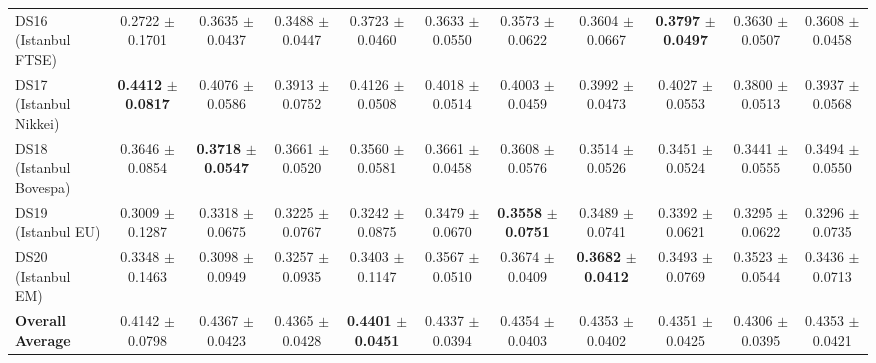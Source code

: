 \begin{table}[t]
{{\begin{tabular}{lcccccccccc}
DS16 (Istanbul FTSE) & 0.2722 $\pm$ 0.1701 & 0.3635 $\pm$ 0.0437 & 0.3488 $\pm$ 0.0447 & 0.3723 $\pm$ 0.0460 & 0.3633 $\pm$ 0.0550 & 0.3573 $\pm$ 0.0622 & 0.3604 $\pm$ 0.0667 & \textbf{0.3797} $\pm$ \textbf{0.0497} & 0.3630 $\pm$ 0.0507 & 0.3608 $\pm$ 0.0458 \\
DS17 (Istanbul Nikkei) & \textbf{0.4412} $\pm$ \textbf{0.0817} & 0.4076 $\pm$ 0.0586 & 0.3913 $\pm$ 0.0752 & 0.4126 $\pm$ 0.0508 & 0.4018 $\pm$ 0.0514 & 0.4003 $\pm$ 0.0459 & 0.3992 $\pm$ 0.0473 & 0.4027 $\pm$ 0.0553 & 0.3800 $\pm$ 0.0513 & 0.3937 $\pm$ 0.0568 \\
DS18 (Istanbul Bovespa) & 0.3646 $\pm$ 0.0854 & \textbf{0.3718} $\pm$ \textbf{0.0547} & 0.3661 $\pm$ 0.0520 & 0.3560 $\pm$ 0.0581 & 0.3661 $\pm$ 0.0458 & 0.3608 $\pm$ 0.0576 & 0.3514 $\pm$ 0.0526 & 0.3451 $\pm$ 0.0524 & 0.3441 $\pm$ 0.0555 & 0.3494 $\pm$ 0.0550 \\
DS19 (Istanbul EU) & 0.3009 $\pm$ 0.1287 & 0.3318 $\pm$ 0.0675 & 0.3225 $\pm$ 0.0767 & 0.3242 $\pm$ 0.0875 & 0.3479 $\pm$ 0.0670 & \textbf{0.3558} $\pm$ \textbf{0.0751} & 0.3489 $\pm$ 0.0741 & 0.3392 $\pm$ 0.0621 & 0.3295 $\pm$ 0.0622 & 0.3296 $\pm$ 0.0735 \\
DS20 (Istanbul EM) & 0.3348 $\pm$ 0.1463 & 0.3098 $\pm$ 0.0949 & 0.3257 $\pm$ 0.0935 & 0.3403 $\pm$ 0.1147 & 0.3567 $\pm$ 0.0510 & 0.3674 $\pm$ 0.0409 & \textbf{0.3682} $\pm$ \textbf{0.0412} & 0.3493 $\pm$ 0.0769 & 0.3523 $\pm$ 0.0544 & 0.3436 $\pm$ 0.0713 \\
\midrule
\textbf{Overall Average} & 0.4142 $\pm$ 0.0798 & 0.4367 $\pm$ 0.0423 & 0.4365 $\pm$ 0.0428 & \textbf{0.4401} $\pm$ \textbf{0.0451} & 0.4337 $\pm$ 0.0394 & 0.4354 $\pm$ 0.0403 & 0.4353 $\pm$ 0.0402 & 0.4351 $\pm$ 0.0425 & 0.4306 $\pm$ 0.0395 & 0.4353 $\pm$ 0.0421 \\
\bottomrule
\end{tabular}%
}%
}
\end{table}

